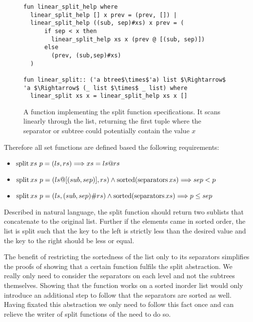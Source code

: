 \begin{figure}
    
\begin{lstlisting}[mathescape=true, language=Isabelle]
fun linear_split_help where
  linear_split_help [] x prev = (prev, []) |
  linear_split_help ((sub, sep)#xs) x prev = (
      if sep < x then
        linear_split_help xs x (prev @ [(sub, sep)])
      else
        (prev, (sub,sep)#xs)
  )

fun linear_split:: ('a btree$\times$'a) list $\Rightarrow$ 'a $\Rightarrow$ (_ list $\times$ _ list) where
  linear_split xs x = linear_split_help xs x []
\end{lstlisting}
\caption{A function implementing the split function specifications.
It scans linearly through the list, returning the first tuple where the separator
or subtree could potentially contain the value $x$}
\label{fig:linear_split}

\end{figure}

Therefore all set functions are defined based the following requirements:

\begin{itemize}
    \item $\operatorname{split} xs\ p = (ls,rs) \Longrightarrow xs = ls @ rs$
    \item $\operatorname{split} xs\ p = (ls@[(sub,sep)],rs) \wedge \operatorname{sorted} (\operatorname{separators} xs) \Longrightarrow sep < p$
    \item $\operatorname{split} xs\ p = (ls,(sub,sep)\#rs) \wedge \operatorname{sorted} (\operatorname{separators} xs) \Longrightarrow p \le sep$
\end{itemize}

Described in natural language, the split function should return two sublists
that concatenate to the original list.
Further if the elements came in sorted order,
the list is split such that the key to the left is strictly less than the desired value
and the key to the right should be less or equal.

The benefit of restricting the sortedness of the list only to its separators
simplifies the proofs of showing that a certain function fulfils the split abstraction.
We really only need to consider the separators on each level and not the subtrees themselves.
Showing that the function works on a sorted inorder list
would only introduce an additional step to follow that the separators are sorted as well.
Having fixated this abstraction we only need to follow this fact once
and can relieve the writer of split functions of the need to do so.

